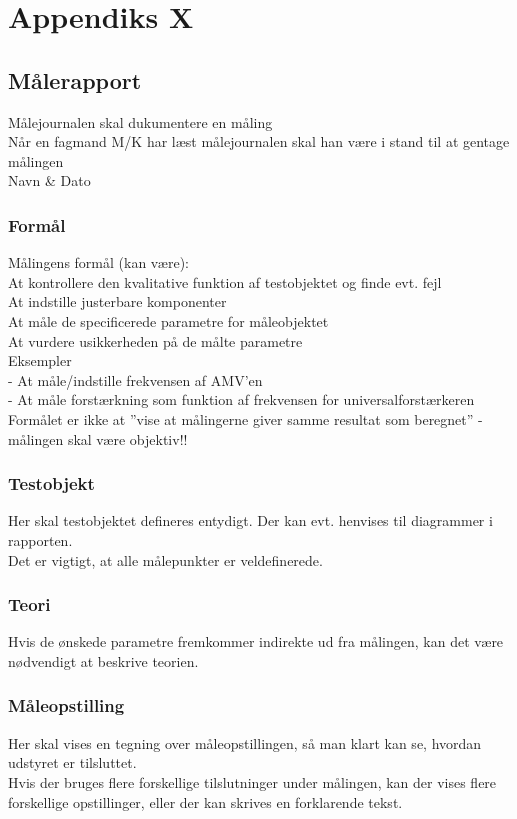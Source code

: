 %
%
\chapter{Appendiks X}
\label{maalejournal}
\section*{Målerapport}
Målejournalen skal dukumentere en måling\\
Når en fagmand M/K har læst målejournalen skal han være i stand til at gentage målingen\\
Navn \& Dato

\subsection*{Formål}
Målingens formål (kan være):\\
At kontrollere den kvalitative funktion af testobjektet og finde evt. fejl\\
At indstille justerbare komponenter \\
At måle de specificerede parametre for måleobjektet \\
At vurdere usikkerheden på de målte parametre\\
Eksempler \\
- At måle/indstille frekvensen af AMV’en\\
- At måle forstærkning som funktion af frekvensen for universalforstærkeren\\
Formålet er ikke at ”vise at målingerne giver samme resultat som beregnet” - målingen skal være objektiv!!\\

\subsection*{Testobjekt}
Her skal testobjektet defineres entydigt. Der kan evt. henvises til diagrammer i rapporten.\\
Det er vigtigt, at alle målepunkter er veldefinerede.\\

\subsection*{Teori}
Hvis de ønskede parametre fremkommer indirekte ud fra målingen, kan det være nødvendigt at beskrive teorien.\\

\subsection*{Måleopstilling}
Her skal vises en tegning over måleopstillingen, så man klart kan se, hvordan udstyret er tilsluttet.\\
Hvis der bruges flere forskellige tilslutninger under målingen, kan der vises flere forskellige opstillinger, eller der kan skrives en forklarende tekst.\\

